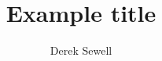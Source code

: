 \documentclass{lincolntex/lincoln}
\begin{document}
\title{Example title}
\author{Derek Sewell}
\maketitle
\thispagestyle{fancy}
\tableofcontents


\clearpage
\printbibliography
\end{document}
